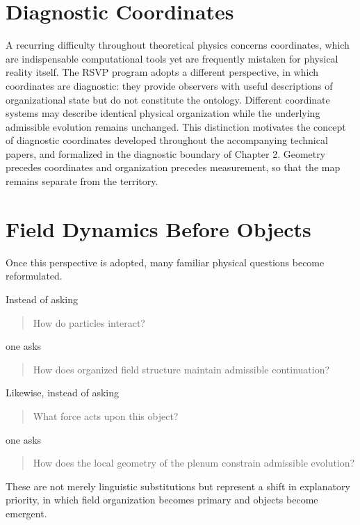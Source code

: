 \documentclass[11pt,oneside]{book}
\numberwithin{equation}{chapter}
\theoremstyle{definition}
\theoremstyle{plain}
\begin{document}
\section{Diagnostic Coordinates}

A recurring difficulty throughout theoretical physics concerns coordinates, which are indispensable computational tools yet are frequently mistaken for physical reality itself. The RSVP program adopts a different perspective, in which coordinates are diagnostic: they provide observers with useful descriptions of organizational state but do not constitute the ontology. Different coordinate systems may describe identical physical organization while the underlying admissible evolution remains unchanged. This distinction motivates the concept of diagnostic coordinates developed throughout the accompanying technical papers, and formalized in the diagnostic boundary of Chapter 2. Geometry precedes coordinates and organization precedes measurement, so that the map remains separate from the territory.

\section{Field Dynamics Before Objects}

Once this perspective is adopted, many familiar physical questions become
reformulated.

Instead of asking

\begin{quote}
How do particles interact?
\end{quote}

one asks

\begin{quote}
How does organized field structure maintain admissible continuation?
\end{quote}

Likewise, instead of asking

\begin{quote}
What force acts upon this object?
\end{quote}

one asks

\begin{quote}
How does the local geometry of the plenum constrain admissible evolution?
\end{quote}

These are not merely linguistic substitutions but represent a shift in explanatory priority, in which field organization becomes primary and objects become emergent.
\end{document}
